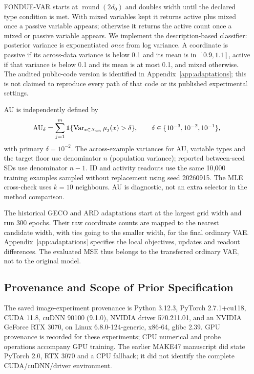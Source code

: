 FONDUE-VAR starts at $\operatorname{round}(2d_0)$ and doubles width until
the declared type condition is met. With mixed variables kept it returns
active plus mixed once a passive variable appears; otherwise it returns
the active count once a mixed or passive variable appears. We implement
the description-based classifier: posterior variance is exponentiated
\emph{once} from log variance. A coordinate is passive if its across-data
variance is below 0.1 and its mean is in $[0.9,1.1]$, active if that
variance is below 0.1 and its mean is at most 0.1, and mixed otherwise.
The audited public-code version is identified in
Appendix~\ref{app:adaptations}; this is not claimed to reproduce every
path of that code or its published experimental settings.

AU is independently defined by
\begin{equation}
 \mathrm{AU}_\delta=\sum_{j=1}^{m}
 \mathbf1\{\operatorname{Var}_{x\in X_{\rm est}}\mu_j(x)>\delta\},
 \qquad \delta\in\{10^{-3},10^{-2},10^{-1}\},
 \label{eq:au}
\end{equation}
with primary $\delta=10^{-2}$. The across-example variances for AU,
variable types and the target floor use denominator $n$ (population
variance); reported between-seed SDs use denominator $n-1$.
ID and activity readouts use the same
10,000 training examples sampled without replacement using seed
20260915. The MLE cross-check uses $k=10$ neighbours. AU is diagnostic,
not an extra selector in the method comparison.

The historical GECO and ARD adaptations start at the largest grid width and run
300 epochs. Their raw coordinate counts are mapped to the nearest
candidate width, with ties going to the smaller width, for the final
ordinary VAE. Appendix~\ref{app:adaptations} specifies the local
objectives, updates and readout differences. The evaluated MSE thus
belongs to the transferred ordinary VAE, not to the original model.

\subsection{Provenance and Scope of Prior Specification}\label{sec:provenance}
The saved image-experiment provenance is Python 3.12.3, PyTorch
2.7.1+cu118, CUDA 11.8, cuDNN 90100 (9.1.0), NVIDIA driver 570.211.01,
and an NVIDIA GeForce RTX 3070, on Linux 6.8.0-124-generic, x86-64,
glibc 2.39. GPU provenance is recorded for these experiments; CPU
numerical and probe operations accompany GPU training. The earlier
MAKE47 manuscript did state PyTorch 2.0, RTX 3070 and a CPU fallback;
it did not identify the complete CUDA/cuDNN/driver environment.

